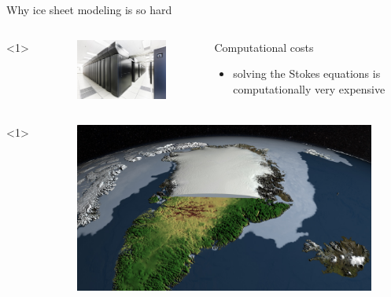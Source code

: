 \documentclass[hide notes,intlimits]{beamer}
\begin{document}
\begin{frame}{Why ice sheet modeling is so hard}
    \begin{columns}[c]<1>
      \begin{column}{.3\linewidth}
        \begin{figure}
          \includegraphics[width=\linewidth]{bw_front_sm}
        \end{figure}
      \end{column}
      \begin{column}{.67\linewidth}
        \begin{block}{Computational costs}
        \begin{itemize}
        \item solving the Stokes equations is computationally very expensive
        \end{itemize}
      \end{block}
      \end{column}
    \end{columns}
    \begin{columns}[c]<1>
      \begin{column}{.28\linewidth}
        \begin{figure}
          \includegraphics[width=\linewidth]{canale_grande_V05}

\end{figure}
\end{column}
\end{columns}
\end{frame}
\end{document}
